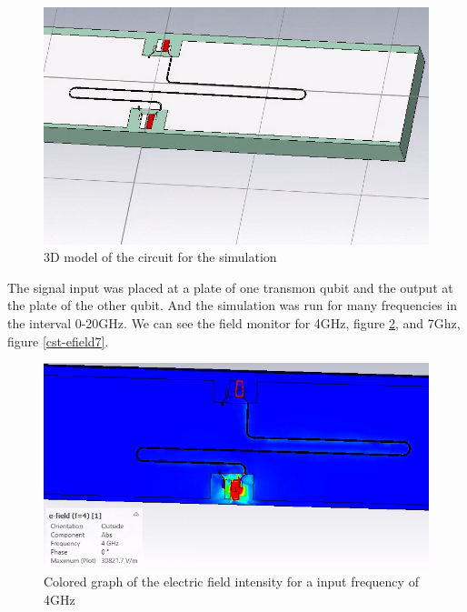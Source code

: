 \documentclass[12pt]{article}
\numberwithin{equation}{subsection}
\begin{document}
\begin{figure}[h]
\centering
\includegraphics[width=\maxwidth,height=\maxheight,keepaspectratio]{images/cst-component.png}
\caption{3D model of the circuit for the simulation}
\label{cst-component}
\end{figure}

The signal input was placed at a plate of one transmon qubit and the output at the plate of the other qubit. And the simulation was run for many frequencies in the interval 0-20GHz. We can see the field monitor for 4GHz, figure \ref{cst-efield4}, and 7Ghz, figure \ref{cst-efield7}. 


\begin{figure}[h]
\centering
\includegraphics[width=\maxwidth,height=\maxheight,keepaspectratio]{images/cst-efield4.png}
\caption{Colored graph of the electric field intensity for a input frequency of 4GHz}
\label{cst-efield4}
\end{figure}
\end{document}
